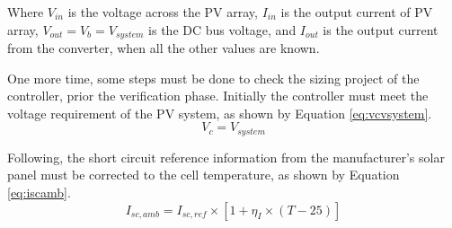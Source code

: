 \documentclass[journal]{IEEEtran}
\begin{document}
Where $ V_{in} $ is the voltage across the PV array, $ I_{in} $ is the output current of PV array, $ V_{out}=V_{b}=V_{system} $ is the  DC bus voltage, and $ I_{out} $ is the output current from the converter, when all the other values are known.

% 
%
%
%
% 
%  
% 
 
One more time, some steps must be done to check the sizing project of the controller, prior the verification phase. Initially the controller must meet the voltage requirement of the PV system, as shown by Equation \ref{eq:vcvsystem}. 
\begin{equation}
\label{eq:vcvsystem}
V_{c} = V_{system}
\end{equation}

Following, the short circuit reference information from the manufacturer's solar panel must be corrected to the cell temperature, as shown by Equation \ref{eq:iscamb}.
\begin{equation}
\label{eq:iscamb}
I_{sc,amb} = I_{sc,ref} \times \left[ 1 + \eta_{I} \times (T-25) \right] 
\end{equation}
\end{document}
